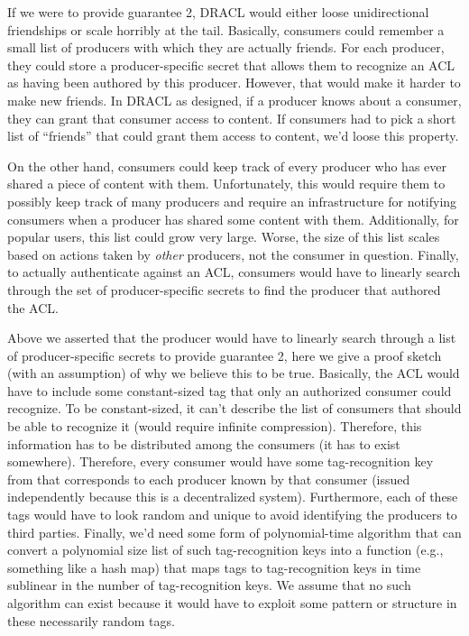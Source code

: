 \documentclass[pdftex,12pt,a4papaer,twoside,notitlepage]{report}
\begin{document}
If we were to provide guarantee 2, DRACL would either loose unidirectional
friendships or scale horribly at the tail. Basically, consumers could remember a
small list of producers with which they are actually friends. For each producer,
they could store a producer-specific secret that allows them to recognize an ACL
as having been authored by this producer. However, that would make it harder to
make new friends. In DRACL as designed, if a producer knows about a consumer,
they can grant that consumer access to content. If consumers had to pick a short
list of ``friends'' that could grant them access to content, we'd loose this
property.

On the other hand, consumers could keep track of every producer who has ever
shared a piece of content with them. Unfortunately, this would require them to
possibly keep track of many producers and require an infrastructure for
notifying consumers when a producer has shared some content with them.
Additionally, for popular users, this list could grow very large. Worse, the
size of this list scales based on actions taken by \emph{other} producers, not
the consumer in question. Finally, to actually authenticate against an ACL,
consumers would have to linearly search through the set of producer-specific
secrets to find the producer that authored the ACL\@.

Above we asserted that the producer would have to linearly search through a list
of producer-specific secrets to provide guarantee 2, here we give a proof sketch
(with an assumption) of why we believe this to be true. Basically, the ACL would
have to include some constant-sized tag that only an authorized consumer could
recognize. To be constant-sized, it can't describe the list of consumers that
should be able to recognize it (would require infinite compression). Therefore,
this information has to be distributed among the consumers (it has to exist
somewhere). Therefore, every consumer would have some tag-recognition key from
that corresponds to each producer known by that consumer (issued independently
because this is a decentralized system). Furthermore, each of these tags would
have to look random and unique to avoid identifying the producers to third
parties. Finally, we'd need some form of polynomial-time algorithm that can
convert a polynomial size list of such tag-recognition keys into a function
(e.g., something like a hash map) that maps tags to tag-recognition keys in time
sublinear in the number of tag-recognition keys. We assume that no such
algorithm can exist because it would have to exploit some pattern or structure
in these necessarily random tags.
\end{document}
